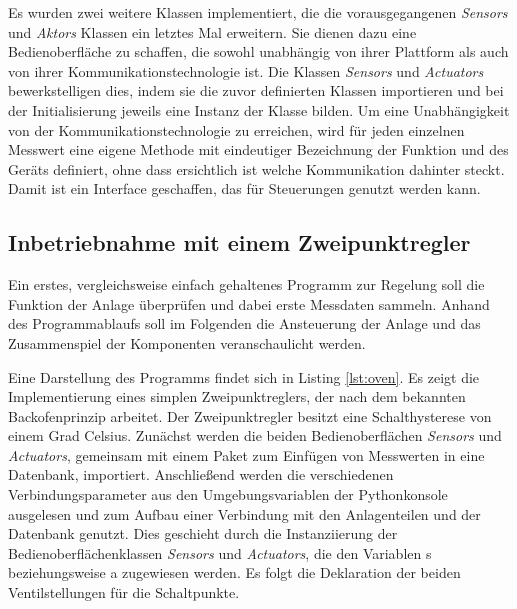 

Es wurden zwei weitere Klassen implementiert, die die vorausgegangenen \textit{Sensors} und \textit{Aktors} Klassen ein letztes Mal erweitern. Sie dienen dazu eine Bedienoberfläche zu schaffen, die sowohl unabhängig von ihrer Plattform als auch von ihrer Kommunikationstechnologie ist. Die Klassen \textit{Sensors} und \textit{Actuators} bewerkstelligen dies, indem sie die zuvor definierten Klassen importieren und bei der Initialisierung jeweils eine Instanz der Klasse bilden. Um eine Unabhängigkeit von der Kommunikationstechnologie zu erreichen, wird für jeden einzelnen Messwert eine eigene Methode mit eindeutiger Bezeichnung der Funktion und des Geräts definiert, ohne dass ersichtlich ist welche Kommunikation dahinter steckt. Damit ist ein Interface geschaffen, das für Steuerungen genutzt werden kann.



\subsection{Inbetriebnahme mit einem Zweipunktregler}

Ein erstes, vergleichsweise einfach gehaltenes Programm zur Regelung soll die Funktion der Anlage überprüfen und dabei erste Messdaten sammeln. Anhand des Programmablaufs soll im Folgenden die Ansteuerung der Anlage und das Zusammenspiel der Komponenten veranschaulicht werden.

Eine Darstellung des Programms findet sich in Listing \ref{lst:oven}. Es zeigt die Implementierung eines simplen Zweipunktreglers, der nach dem bekannten Backofenprinzip arbeitet. Der Zweipunktregler besitzt eine Schalthysterese von einem Grad Celsius. Zunächst werden die beiden Bedienoberflächen \textit{Sensors} und \textit{Actuators}, gemeinsam mit einem Paket zum Einfügen von Messwerten in eine Datenbank, importiert. Anschließend werden die verschiedenen Verbindungsparameter aus den Umgebungsvariablen der Pythonkonsole ausgelesen und zum Aufbau einer Verbindung mit den Anlagenteilen und der Datenbank genutzt. Dies geschieht durch die Instanziierung der Bedienoberflächenklassen \textit{Sensors} und \textit{Actuators}, die den Variablen s beziehungsweise a zugewiesen werden. Es folgt die Deklaration der beiden Ventilstellungen für die Schaltpunkte. 

